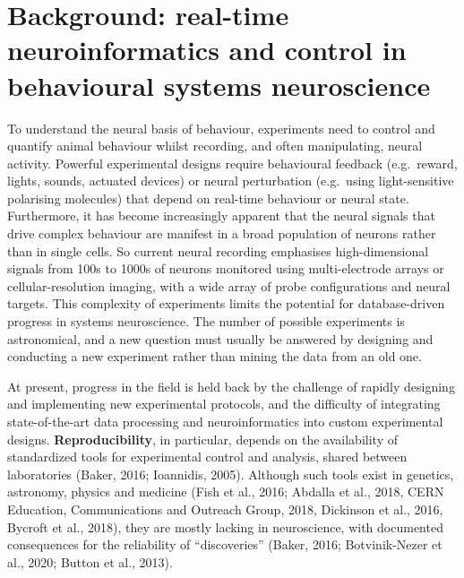 \section{Background: real-time neuroinformatics and control in behavioural systems
  neuroscience}

To understand the neural basis of behaviour, experiments need to control and quantify animal behaviour whilst recording, and often manipulating, neural activity. 
%
Powerful experimental designs require behavioural feedback (e.g.\ reward, lights, sounds, actuated
devices) or neural perturbation (e.g.\ using light-sensitive polarising
molecules) that depend on real-time behaviour or neural state.
%
Furthermore, it has become increasingly apparent that the neural signals that
drive complex behaviour are manifest in a broad population of neurons rather
than in single cells.  So current neural recording emphasises high-dimensional
signals from 100s to 1000s of neurons monitored using multi-electrode arrays or cellular-resolution imaging, with a wide array of probe configurations and neural targets.
%
This complexity of experiments limits the potential for database-driven progress in systems neuroscience.
%
The number of possible experiments is astronomical, and a new question must
usually be answered by designing and conducting a new experiment rather than
mining the data from an old one.

At present, progress in the field is held back by the challenge of rapidly designing and implementing new experimental protocols, and the difficulty of integrating state-of-the-art data processing and
neuroinformatics into custom experimental designs.
%
\textbf{Reproducibility}, in particular, depends on the availability of standardized tools for experimental control and analysis, shared between laboratories (Baker, 2016; Ioannidis, 2005). Although such tools exist in genetics, astronomy, physics and medicine (Fish et al., 2016; Abdalla et al., 2018, CERN Education, Communications and Outreach Group, 2018, Dickinson et al., 2016, Bycroft et al., 2018), they are mostly lacking in neuroscience, with documented consequences for the reliability of ``discoveries'' (Baker, 2016; Botvinik-Nezer et al., 2020; Button et al., 2013). 

